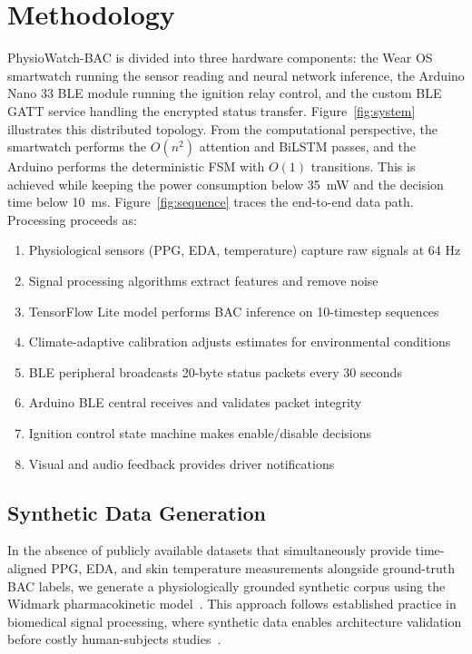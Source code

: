 \documentclass[HARVARD,Times2COL]{WileyNJDv5}
\begin{document}
\section{Methodology}\label{sec2}
PhysioWatch-BAC is divided into three hardware components: the Wear OS smartwatch running the sensor reading and neural network inference, the Arduino Nano 33 BLE module running the ignition relay control, and the custom BLE GATT service handling the encrypted status transfer. Figure~\ref{fig:system} illustrates this distributed topology.
From the computational perspective, the smartwatch performs the $O(n^2)$ attention and BiLSTM passes, and the Arduino performs the deterministic FSM with $O(1)$ transitions. This is achieved while keeping the power consumption below 35~mW and the decision time below 10~ms. Figure~\ref{fig:sequence} traces the end-to-end data path. Processing proceeds as:
\begin{enumerate}
    \item Physiological sensors (PPG, EDA, temperature) capture raw signals at 64 Hz
    \item Signal processing algorithms extract features and remove noise
    \item TensorFlow Lite model performs BAC inference on 10-timestep sequences
    \item Climate-adaptive calibration adjusts estimates for environmental conditions
    \item BLE peripheral broadcasts 20-byte status packets every 30 seconds
    \item Arduino BLE central receives and validates packet integrity
    \item Ignition control state machine makes enable/disable decisions
    \item Visual and audio feedback provides driver notifications
\end{enumerate}
\subsection{Synthetic Data Generation}\label{sec:synthetic}
In the absence of publicly available datasets that simultaneously provide time-aligned PPG, EDA, and skin temperature measurements alongside ground-truth BAC labels, we generate a physiologically grounded synthetic corpus using the Widmark pharmacokinetic model~\citep{widmark1932}. This approach follows established practice in biomedical signal processing, where synthetic data enables architecture validation before costly human-subjects studies~\citep{reiss2019}.
\end{document}
